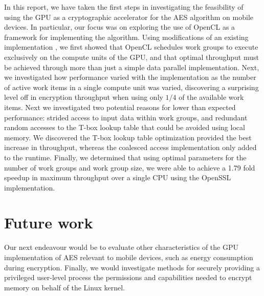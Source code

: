 \documentclass[conference,10pt]{IEEEtran}
\begin{document}
In this report, we have taken the first steps in investigating the feasibility of using the GPU as a 
cryptographic accelerator for the AES algorithm on mobile devices.  In particular, our focus was on 
exploring the use of OpenCL as a framework for implementing the algorithm.  Using modifications of an 
existing implementation \cite{opencl_impl}, we first showed that OpenCL schedules work groups to execute 
exclusively on the compute units of the GPU, and that optimal throughput must be achieved through more than 
just a simple data parallel implementation. Next, we investigated how performance varied with the 
implementation as the number of active work items in a single compute unit was varied, discovering a 
surprising level off in encryption throughput when using only $1/4$ of the available work items.  Next we 
investigated two potential reasons for lower than expected performance: strided access to input data within 
work groups, and redundant random accesses to the T-box lookup table that could be avoided using local memory.  
We discovered the T-box lookup table optimization provided the best increase in throughput, whereas the 
coalesced access implementation only added to the runtime.  Finally, we determined that using optimal 
parameters for the number of work groups and work group size, we were able to achieve a 1.79 fold speedup in 
maximum throughput over a single CPU using the OpenSSL implementation. 

\section{Future work}

Our next endeavour would be to evaluate other characteristics of the GPU implementation of AES relevant to 
mobile devices, such as energy consumption during encryption.  Finally, we would investigate methods for 
securely providing a privileged user-level process the permissions and capabilities needed to encrypt 
memory on behalf of the Linux kernel.




\end{document}

